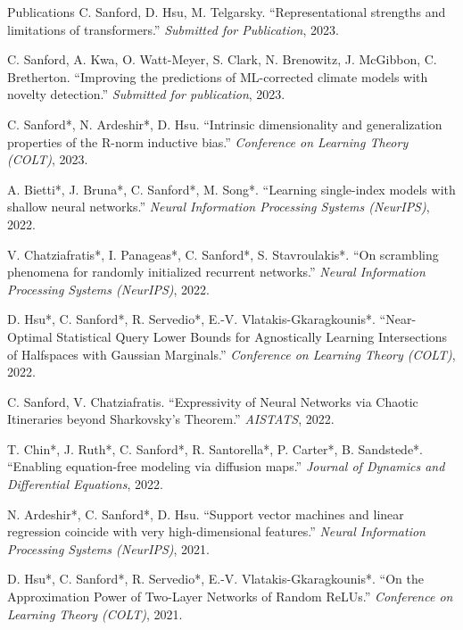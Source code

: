 \documentclass{resume} %
\begin{document}
\begin{rSection}{Publications}
C. Sanford, D. Hsu, M. Telgarsky. ``Representational strengths and limitations of transformers.'' \textit{Submitted for Publication}, 2023.

C. Sanford, A. Kwa, O. Watt-Meyer, S. Clark, N. Brenowitz, J. McGibbon, C. Bretherton. ``Improving the predictions of ML-corrected climate models with novelty detection.'' \textit{Submitted for publication}, 2023.

C. Sanford*, N. Ardeshir*, D. Hsu. ``Intrinsic dimensionality and generalization properties of the R-norm inductive bias.'' \textit{Conference on Learning Theory (COLT)}, 2023.

A. Bietti*, J. Bruna*, C. Sanford*, M. Song*. ``Learning single-index models with shallow neural networks.'' \textit{Neural Information Processing Systems (NeurIPS)}, 2022.

V. Chatziafratis*, I. Panageas*, C. Sanford*, S. Stavroulakis*. ``On scrambling phenomena for randomly initialized recurrent networks.'' \textit{Neural Information Processing Systems (NeurIPS)}, 2022.

D. Hsu*, C. Sanford*, R. Servedio*, E.-V. Vlatakis-Gkaragkounis*. ``Near-Optimal Statistical Query Lower Bounds for Agnostically Learning Intersections of Halfspaces with Gaussian Marginals.'' \textit{Conference on Learning Theory (COLT)}, 2022.

C. Sanford, V. Chatziafratis. ``Expressivity of Neural Networks via Chaotic Itineraries beyond Sharkovsky's Theorem.'' \textit{AISTATS}, 2022.

T. Chin*, J. Ruth*, C. Sanford*, R. Santorella*, P. Carter*, B. Sandstede*. ``Enabling equation-free modeling via diffusion maps.'' \textit{Journal of Dynamics and Differential Equations}, 2022.


N. Ardeshir*, C. Sanford*, D. Hsu. ``Support vector machines and linear regression coincide with very high-dimensional features.'' \textit{Neural Information Processing Systems (NeurIPS)}, 2021.


D. Hsu*, C. Sanford*, R. Servedio*, E.-V. Vlatakis-Gkaragkounis*. ``On the Approximation Power of Two-Layer Networks of Random ReLUs.'' \textit{Conference on Learning Theory (COLT)}, 2021.




\end{rSection}
\end{document}
